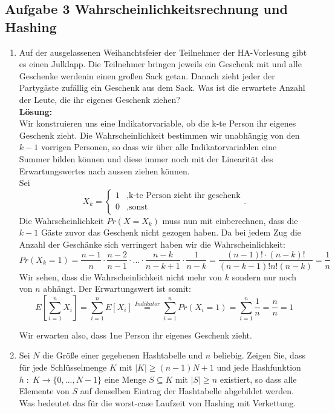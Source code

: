 \documentclass[11pt,a4paper,ngerman]{article}
\begin{document}
\subsection*{Aufgabe 3 \mdseries Wahrscheinlichkeitsrechnung und Hashing}

\begin{enumerate}[\bfseries a)]

\item Auf der ausgelassenen Weihanchtsfeier der Teilnehmer der HA-Vorlesung gibt es einen Julklapp. Die Teilnehmer bringen jeweils ein Geschenk mit und alle Geschenke werdenin einen großen Sack getan. Danach zieht jeder der Partygäste zufällig ein Geschenk aus dem Sack. Was ist die erwartete Anzahl der Leute, die ihr eigenes Geschenk ziehen?\\

\textbf{Lösung:}\\
Wir konstruieren uns eine Indikatorvariable, ob die k-te Person ihr eigenes Geschenk zieht. Die Wahrscheinlichkeit bestimmen wir unabhängig von den $k-1$ vorrigen Personen, so dass wir über alle Indikatorvariablen eine Summer bilden können und diese immer noch mit der Linearität des Erwartungswertes nach aussen ziehen können.\\

Sei
$$
X_k = \left\{ \begin{array}{lr} 1 &,\text{k-te Person zieht ihr geschenk}\\ 0 &, \text{sonst}\end{array} \right. .
$$
Die Wahrscheinlichkeit $Pr(X = X_k)$  muss nun mit einberechnen, dass die $k-1$ Gäste zuvor das Geschenk nicht gezogen haben. Da bei jedem Zug die Anzahl der Geschänke sich verringert haben wir die Wahrscheinlichkeit:
$$
Pr(X_k = 1) = \frac{n-1}{n} \cdot \frac{n-2}{n-1} \cdot ... \cdot \frac{n - k}{n-k +1} \cdot \frac{1}{n-k} = \frac{(n-1)! \cdot (n-k)! }{(n-k -1)! n! (n-k)} = \frac{1}{n}
$$
Wir sehen, dass  die Wahrscheinlichkeit nicht mehr von $k$ sondern nur noch von $n$ abhängt. Der Erwartungswert ist somit:\\
$$
E \left[ \sum_{i=1}^{n} X_i \right] = \sum_{i=1}^n E \left[ X_i \right] \stackrel{Indikator}{=} \sum_{i=1}^n Pr(X_i=1) = \sum_{i=1}^n \frac{1}{n} = \frac{n}{n} = 1
$$

Wir erwarten also, dass 1ne Person ihr eigenes Geschenk zieht.

\item Sei $N$ die Größe einer gegebenen Hashtabelle und $n$ beliebig. Zeigen Sie, dass für jede Schlüsselmenge $K$ mit $|K| \geq (n-1)N+1$ und jede Hashfunktion $h \; : \; K \rightarrow \{ 0 , ... , N-1\}$ eine Menge $S \subseteq K$ mit $|S| \geq n$ existiert, so dass alle Elemente von $S$ auf denselben Eintrag der Hashtabelle abgebildet werden.\\
Was bedeutet das für die worst-case Laufzeit von Hashing mit Verkettung.\\


\end{enumerate}
\end{document}
